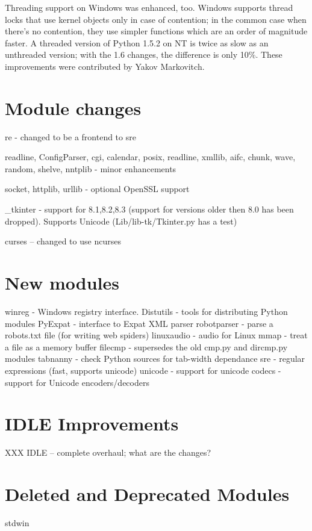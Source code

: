 \documentclass{howto}
\begin{document}
Threading support on Windows was enhanced, too.  Windows supports
thread locks that use kernel objects only in case of contention; in
the common case when there's no contention, they use simpler functions
which are an order of magnitude faster.  A threaded version of Python
1.5.2 on NT is twice as slow as an unthreaded version; with the 1.6
changes, the difference is only 10\%.  These improvements were
contributed by Yakov Markovitch.

\section{Module changes}

re - changed to be a frontend to sre

readline, ConfigParser, cgi, calendar, posix, readline, xmllib, aifc, chunk,
wave, random, shelve, nntplib - minor enhancements

socket, httplib, urllib - optional OpenSSL support

_tkinter - support for 8.1,8.2,8.3 (support for versions older then 8.0
has been dropped).  Supports Unicode (Lib/lib-tk/Tkinter.py has a test)

curses -- changed to use ncurses

\section{New modules}

winreg - Windows registry interface.
Distutils - tools for distributing Python modules
PyExpat - interface to Expat XML parser
robotparser - parse a robots.txt file (for writing web spiders)
linuxaudio - audio for Linux
mmap - treat a file as a memory buffer
filecmp - supersedes the old cmp.py and dircmp.py modules
tabnanny - check Python sources for tab-width dependance
sre -  regular expressions (fast, supports unicode)
unicode - support for unicode
codecs - support for Unicode encoders/decoders

\section{IDLE Improvements}

XXX IDLE -- complete overhaul; what are the changes?

\section{Deleted and Deprecated Modules}

stdwin
\end{document}
